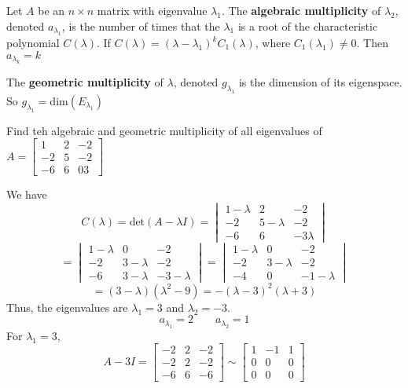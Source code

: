 \documentclass[english, 12pt]{article}
\begin{document}
\begin{defn}
Let $A$ be an $n \times n$ matrix with eigenvalue $\lambda_1$. The \textbf{algebraic multiplicity} of $\lambda_2$, denoted $a_{\lambda_1}$, is the number of times that the $\lambda_1$ is a root of the characteristic polynomial $C(\lambda)$. If $C(\lambda) = (\lambda - \lambda_1)^kC_1(\lambda)$, where $C_1(\lambda_1) \neq 0$. Then $a_{\lambda_k} = k$
\end{defn}

\begin{defn}
The \textbf{geometric multiplicity} of $\lambda$, denoted $g_{\lambda_1}$ is the dimension of its eigenspace. So $g_{\lambda_1} = \text{dim}(E_{\lambda_1})$
\end{defn}

\begin{exmp}
Find teh algebraic and geometric multiplicity of all eigenvalues of $A = \begin{bmatrix} 1 & 2 & -2 \\ -2 & 5 & -2 \\ -6 & 6 & 03 \end{bmatrix}$
\begin{sol}
We have
\[C(\lambda) = \text{det}(A - \lambda I) = \begin{vmatrix} 1 - \lambda & 2 & -2 \\ -2 & 5 - \lambda & -2 \\ -6 & 6 & -3 \lambda \end{vmatrix}\]
\[ = \begin{vmatrix} 1 - \lambda & 0 & -2 \\ -2 & 3 - \lambda & -2 \\ -6 & 3 - \lambda & -3 - \lambda \end{vmatrix} = \begin{vmatrix} 1 - \lambda & 0 & -2 \\ -2 & 3 - \lambda & -2 \\ -4 & 0 & -1 - \lambda \end{vmatrix}\]
\[= (3-\lambda)(\lambda^2 - 9) = - (\lambda - 3)^2(\lambda + 3)\]
Thus, the eigenvalues are $\lambda_1 = 3$ and $\lambda_2 = -3$.
\[a_{\lambda_1} = 2 \qquad a_{\lambda_2} = 1\]
For $\lambda_1 = 3$,
\[A - 3I = \begin{bmatrix} -2 & 2 & -2 \\ -2 & 2 & -2 \\ -6 & 6 & -6 \end{bmatrix} \sim \begin{bmatrix} 1 & -1 & 1 \\ 0 & 0 & 0 \\ 0 & 0 & 0\end{bmatrix}\]

\end{sol}
\end{exmp}
\end{document}
